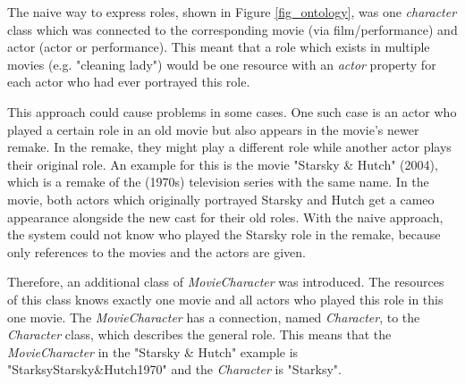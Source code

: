 The naive way to express roles, shown in Figure \ref{fig_ontology}, was one \emph{character} class which was connected to the corresponding movie (via film/performance) and actor (actor or performance).
This meant that a role which exists in multiple movies (e.g. "cleaning lady") would be one resource with an \emph{actor} property for each actor who had ever portrayed this role. 

This approach could cause problems in some cases.
One such case is an actor who played a certain role in an old movie but also appears in the movie's newer remake.
In the remake, they might play a different role while another actor plays their original role. 
An example for this is the movie "Starsky \& Hutch" (2004), which is a remake of the (1970s) television series with the same name.
In the movie, both actors which originally portrayed Starsky and Hutch get a cameo appearance alongside the new cast for their old roles.
With the naive approach, the system could not know who played the Starsky role in the remake, because only references to the movies and the actors are given.

Therefore, an additional class of \emph{MovieCharacter} was introduced.
The resources of this class knows exactly one movie and all actors who played this role in this one movie.
The \emph{MovieCharacter} has a connection, named \emph{Character}, to the \emph{Character} class, which describes the general role.
This means that the \emph{MovieCharacter} in the "Starsky \& Hutch" example is "StarksyStarsky\&Hutch1970" and the \emph{Character} is "Starksy".

